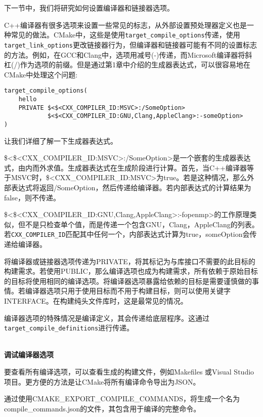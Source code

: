 下一节中，我们将研究如何设置编译器和链接器选项。


C++编译器有很多选项来设置一些常见的标志，从外部设置预处理器定义也是一种常见的做法。CMake中，这些是使用\texttt{target\_compile\_options}传递，使用\texttt{target\_link\_options}更改链接器行为，但编译器和链接器可能有不同的设置标志的方法。例如，在GCC和Clang中，选项用减号(-)传递，而Microsoft编译器将斜杠(/)作为选项的前缀。但是通过第1章中介绍的生成器表达式，可以很容易地在CMake中处理这个问题:

\begin{lstlisting}[style=styleCMake]
target_compile_options(
	hello
	PRIVATE $<$<CXX_COMPILER_ID:MSVC>:/SomeOption>
			$<$<CXX_COMPILER_ID:GNU,Clang,AppleClang>:-someOption>
)
\end{lstlisting}

让我们详细了解一下生成器表达式。

\$<\$<CXX\_COMPILER\_ID:MSVC>:/SomeOption>是一个嵌套的生成器表达式，由内而外求值。生成器表达式在生成阶段进行计算。首先，当C++编译器等于MSVC时，\$<CXX\_COMPILER\_ID:MSVC>为true。若是这种情况，那么外部表达式将返回/SomeOption，然后传递给编译器。若内部表达式的计算结果为false，则不传递。

\$<\$<CXX\_COMPILER\_ID:GNU,Clang,AppleClang>:-fopenmp>的工作原理类似，但不是只检查单个值，而是传递一个包含GNU，Clang，AppleClang的列表。若\texttt{CXX\_COMPILER\_ID}匹配其中任何一个，内部表达式计算为true，someOption会传递给编译器。

将编译器或链接器选项传递为PRIVATE，将其标记为与库接口不需要的此目标的构建需求。若使用PUBLIC，那么编译选项也成为构建需求，所有依赖于原始目标的目标将使用相同的编译选项。将编译器选项暴露给依赖的目标是需要谨慎做的事情。若编译器选项只用于使用目标而不用于构建目标，则可以使用关键字INTERFACE。在构建纯头文件库时，这是最常见的情况。

编译器选项的特殊情况是编译定义，其会传递给底层程序。这通过\texttt{target\_compile\_definitions}进行传递。

\hspace*{\fill} \\ %
\noindent
\textbf{调试编译器选项}

要查看所有编译选项，可以查看生成的构建文件，例如Makefiles 或Visual Studio项目。更方便的方法是让CMake将所有编译命令导出为JSON。

通过使用CMAKE\_EXPORT\_COMPILE\_COMMANDS，将生成一个名为compile\_commands.json的文件，其包含用于编译的完整命令。

